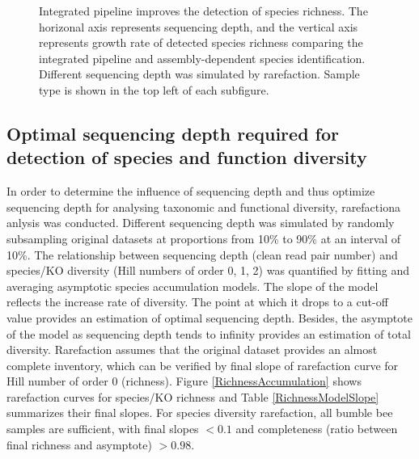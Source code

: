 \documentclass[11pt]{article}
\begin{document}
\begin{figure}[H]
\begin{subfigure}
        \end{subfigure}
        \caption{Integrated pipeline improves the detection of species richness. 
        The horizonal axis represents sequencing depth, and the vertical axis represents growth rate of detected species richness comparing the integrated pipeline and assembly-dependent species identification. 
        Different sequencing depth was simulated by rarefaction.
        Sample type is shown in the top left of each subfigure.}
        \label{CompareSensitivity}
        \end{figure}

    \subsection{Optimal sequencing depth required for detection of species and function diversity}
    In order to determine the influence of sequencing depth and thus optimize sequencing depth for 
    analysing taxonomic and functional diversity, rarefactiona anlysis was conducted. 
    Different sequencing depth was simulated by randomly subsampling original datasets at proportions from 10\% to 90\% at an interval of 10\%. 
    The relationship between sequencing depth (clean read pair number) and species/KO diversity (Hill numbers of order 0, 1, 2) was quantified by fitting and averaging asymptotic species accumulation models. 
    The slope of the model reflects the increase rate of diversity. 
    The point at which it drops to a cut-off value provides an estimation of optimal sequencing depth. 
    Besides, the asymptote of the model as sequencing depth tends to infinity provides an estimation of total diversity. 
    \newline
    Rarefaction assumes that the original dataset provides an almost complete inventory, which can be verified by final slope of rarefaction curve for Hill number of order 0 (richness). 
    Figure \ref{RichnessAccumulation} shows rarefaction curves for species/KO richness and Table \ref{RichnessModelSlope} summarizes their final slopes. 
    For species diversity rarefaction, all bumble bee samples are sufficient, with final slopes $< 0.1$ and completeness (ratio between final richness and asymptote) $> 0.98$. 
\end{document}
